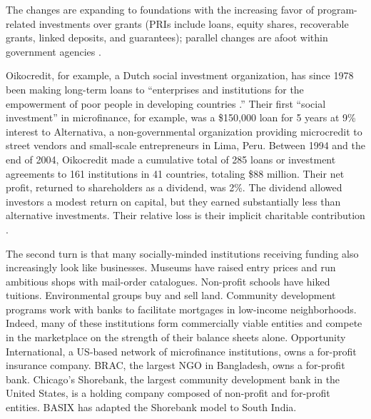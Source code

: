 \documentclass[letterpaper, 12pt]{article}
\begin{document}
The changes are expanding to foundations with the increasing favor of program-related investments over grants (PRIs include loans, equity shares, recoverable grants, linked deposits, and guarantees); parallel changes are afoot within government agencies \citep{marble1989}.


Oikocredit, for example, a Dutch social investment organization, has since 1978 been making long-term loans to ``enterprises and institutions for the empowerment of poor people in developing countries .'' Their first ``social investment'' in microfinance, for example, was a \$150,000 loan for 5 years at 9\% interest to Alternativa, a non-governmental organization providing microcredit to street vendors and small-scale entrepreneurs in Lima, Peru. Between 1994 and the end of 2004, Oikocredit made a cumulative total of 285 loans or investment agreements to 161 institutions in 41 countries, totaling \$88 million. Their net profit, returned to shareholders as a dividend, was 2\%. The dividend allowed investors a modest return on capital, but they earned substantially less than alternative investments. Their relative loss is their implicit charitable contribution \citep{heinen2005}.

The second turn is that many socially-minded institutions receiving funding also increasingly look like businesses. Museums have raised entry prices and run ambitious shops with mail-order catalogues. Non-profit schools have hiked  tuitions. Environmental groups buy and sell land. Community development programs work with banks to facilitate mortgages in low-income neighborhoods. Indeed, many of these institutions form commercially viable entities and compete in
the marketplace on the strength of their balance sheets alone. Opportunity International, a US-based network of microfinance institutions, owns a for-profit insurance company. BRAC, the largest NGO in Bangladesh, owns a for-profit bank. Chicago's Shorebank, the largest community development bank in the United States, is a holding company composed of non-profit and for-profit entities. BASIX has adapted the Shorebank model to South India.

\end{document}
